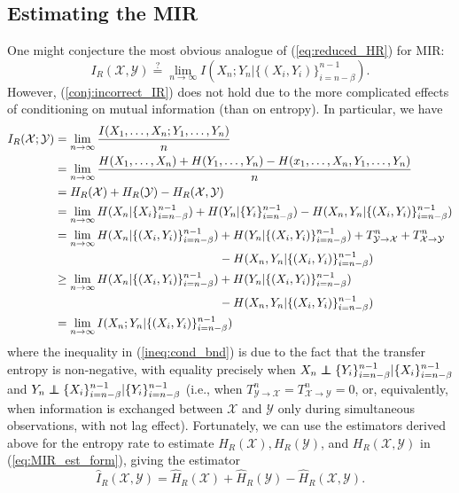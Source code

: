 \documentclass{article} %
\newcommand{\X}{\mathcal{X}}                        %
\newcommand{\Y}{\mathcal{Y}}                        %
\renewcommand{\hat}{\widehat}
\newcommand\ind{\protect\mathpalette{\protect\independenT}{\perp}}
\def\independenT#1#2{\mathrel{\rlap{$#1#2$}\mkern2mu{#1#2}}}
\begin{document}
\subsection{Estimating the MIR}
One might conjecture the most obvious analogue of (\ref{eq:reduced_HR}) for
MIR:
\begin{equation}
I_R(\X,\Y)
    \stackrel{?}{=}
    \lim_{n \to \infty} I(X_n; Y_n | \{(X_i,Y_i)\}_{i = n - \beta}^{n - 1}).
\label{conj:incorrect_IR}
\end{equation}
However, (\ref{conj:incorrect_IR}) does not hold due to the more complicated
effects of conditioning on mutual information (than on entropy). In particular,
we have
\begin{align}
I_R(\X;\Y)
 &  = \lim_{n \to \infty} \frac{I(X_1,\dots,X_n;Y_1,\dots,Y_n)}{n}          \\
 &  = \lim_{n \to \infty} \frac{H(X_1,\dots,X_n) + H(Y_1,\dots,Y_n)
                                    - H(x_1,\dots,X_n,Y_1,\dots,Y_n)}{n}    \\
\label{eq:MIR_est_form}
 &  = H_R(\X) + H_R(\Y) - H_R(\X,\Y)                                        \\
 &  = \lim_{n \to \infty} H(X_n | \{X_i\}_{i = n - \beta}^{n - 1})
                    + H(Y_n | \{Y_i\}_{i = n - \beta}^{n - 1})
                    - H(X_n,Y_n | \{(X_i,Y_i)\}_{i = n - \beta}^{n - 1})    \\
\notag
 &  = \lim_{n \to \infty} H(X_n | \{(X_i,Y_i)\}_{i = n - \beta}^{n - 1})
                        + H(Y_n | \{(X_i,Y_i)\}_{i = n - \beta}^{n - 1})
                        + T_{\Y \to \X}^n + T_{\X \to \Y}^n    \\
\label{ineq:tr_entropy}
 &      \hspace{48.5mm} - H(X_n,Y_n | \{(X_i,Y_i)\}_{i = n - \beta}^{n - 1}) \\
\notag
 &  \geq \lim_{n \to \infty} H(X_n | \{(X_i,Y_i)\}_{i = n - \beta}^{n - 1})
                    + H(Y_n | \{(X_i,Y_i)\}_{i = n - \beta}^{n - 1})    \\
\label{ineq:cond_bnd}
 &      \hspace{48.5mm} - H(X_n,Y_n | \{(X_i,Y_i)\}_{i = n - \beta}^{n - 1}) \\
 & = \lim_{n \to \infty} I(X_n; Y_n | \{(X_i,Y_i)\}_{i = n - \beta}^{n - 1})
\end{align}
where the inequality in (\ref{ineq:cond_bnd}) is due to the fact that the
transfer entropy is non-negative, with equality precisely when
$X_n \ind \{Y_i\}_{i = n - \beta}^{n - 1} | \{X_i\}_{i = n - \beta}^{n - 1}$
and
$Y_n \ind \{X_i\}_{i = n - \beta}^{n - 1} | \{Y_i\}_{i = n - \beta}^{n - 1}$
(i.e., when $T_{\Y \to \X}^n = T_{\X \to \Y}^n = 0$, or, equivalently, when information
is exchanged between $\X$ and $\Y$ only during simultaneous observations, with
not lag effect). Fortunately, we can use the estimators derived above for the
entropy rate to estimate $H_R(\X),H_R(\Y)$, and $H_R(\X,\Y)$ in
(\ref{eq:MIR_est_form}), giving the estimator
\[\hat I_R(\X,\Y) = \hat H_R(\X) + \hat H_R(\Y) - \hat H_R(\X,\Y).\]
\end{document}
